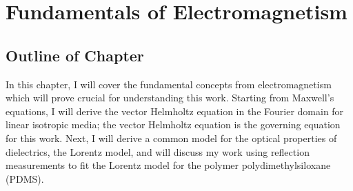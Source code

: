 \chapter[Fundamentals of Electromagnetism][Fundamentals of Electromagnetism]{Fundamentals of Electromagnetism} \label{ch:Electromagnetism}
%
\section{Outline of Chapter}
%
In this chapter, I will cover the fundamental concepts from electromagnetism which will prove crucial for understanding this work. Starting from Maxwell's equations, I will derive the vector Helmholtz equation in the Fourier domain for linear isotropic media; the vector Helmholtz equation is the governing equation for this work. Next, I will derive a common model for the optical properties of dielectrics, the Lorentz model, and will discuss my work using reflection measurements to fit the Lorentz model for the polymer polydimethylsiloxane (PDMS).


